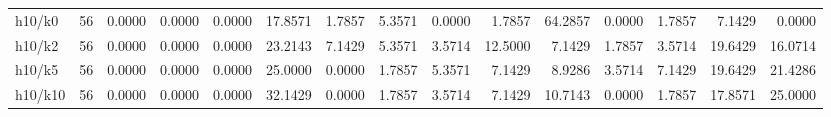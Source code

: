 \begin{tabular}{lrrrrrrrrrrrrrr}
h10/k0 & 56 & 0.0000 & 0.0000 & 0.0000 & 17.8571 & 1.7857 & 5.3571 & 0.0000 & 1.7857 & 64.2857 & 0.0000 & 1.7857 & 7.1429 & 0.0000 \\
h10/k2 & 56 & 0.0000 & 0.0000 & 0.0000 & 23.2143 & 7.1429 & 5.3571 & 3.5714 & 12.5000 & 7.1429 & 1.7857 & 3.5714 & 19.6429 & 16.0714 \\
h10/k5 & 56 & 0.0000 & 0.0000 & 0.0000 & 25.0000 & 0.0000 & 1.7857 & 5.3571 & 7.1429 & 8.9286 & 3.5714 & 7.1429 & 19.6429 & 21.4286 \\
h10/k10 & 56 & 0.0000 & 0.0000 & 0.0000 & 32.1429 & 0.0000 & 1.7857 & 3.5714 & 7.1429 & 10.7143 & 0.0000 & 1.7857 & 17.8571 & 25.0000 \\
\bottomrule
\end{tabular}
